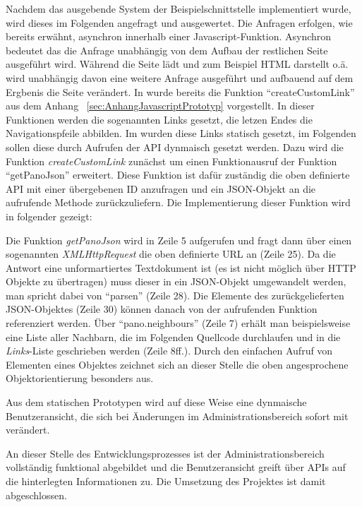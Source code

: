 Nachdem das ausgebende System der Beispielschnittstelle implementiert wurde, wird dieses im Folgenden angefragt und ausgewertet. Die Anfragen erfolgen, wie bereits erwähnt, asynchron innerhalb einer Javascript-Funktion. Asynchron bedeutet das die Anfrage unabhängig von dem Aufbau der restlichen Seite ausgeführt wird. Während die Seite lädt und zum Beispiel HTML darstellt o.ä. wird unabhängig davon eine weitere Anfrage ausgeführt und aufbauend auf dem Ergbenis die Seite verändert.
In  wurde bereits die Funktion "`createCustomLink"' aus dem Anhang ~\ref{sec:AnhangJavascriptPrototyp} vorgestellt. In dieser Funktionen werden die sogenannten Links gesetzt, die letzen Endes die Navigationspfeile abbilden. Im  wurden diese Links statisch gesetzt, im Folgenden sollen diese durch Aufrufen der API dynmaisch gesetzt werden. Dazu wird die Funktion \textit{createCustomLink} zunächst um einen Funktionausruf der Funktion "`getPanoJson"' erweitert. Diese Funktion ist dafür zuständig die oben definierte API mit einer übergebenen ID anzufragen und ein JSON-Objekt an die aufrufende Methode zurückzuliefern. Die Implementierung dieser Funktion wird in folgender  gezeigt:



Die Funktion \textit{getPanoJson} wird in Zeile 5 aufgerufen und fragt dann über einen sogenannten \textit{XMLHttpRequest} die oben definierte URL an (Zeile 25). Da die Antwort eine unformartiertes Textdokument ist (es ist nicht möglich über HTTP Objekte zu übertragen) muss dieser in ein JSON-Objekt umgewandelt werden, man spricht dabei von "`parsen"' (Zeile 28). Die Elemente des zurückgelieferten JSON-Objektes (Zeile 30) können danach von der aufrufenden Funktion referenziert werden. Über "`pano.neighbours"' (Zeile 7) erhält man beispielsweise eine Liste aller Nachbarn, die im Folgenden Quellcode durchlaufen und in die \textit{Links}-Liste geschrieben werden (Zeile 8ff.). Durch den einfachen Aufruf von Elementen eines Objektes zeichnet sich an dieser Stelle die oben angesprochene Objektorientierung besonders aus.

Aus dem statischen Prototypen wird auf diese Weise eine dynmaische Benutzeransicht, die sich bei Änderungen im Administrationsbereich sofort mit verändert.

An dieser Stelle des Entwicklungsprozesses ist der Administrationsbereich vollständig funktional abgebildet und die Benutzeransicht greift über APIs auf die hinterlegten Informationen zu. Die Umsetzung des Projektes ist damit abgeschlossen.